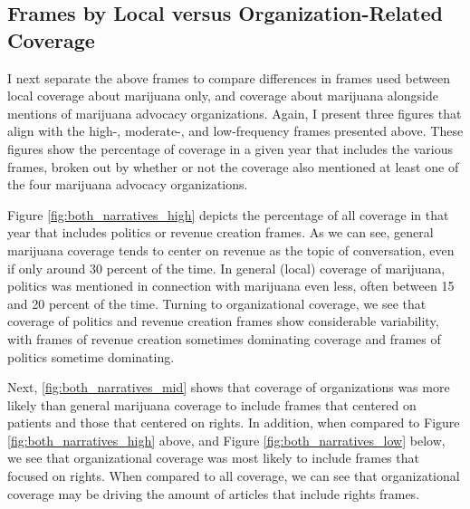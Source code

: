 \subsection{Frames by Local versus Organization-Related Coverage}

I next separate the above frames to compare differences in frames used between local coverage about marijuana only, and coverage about marijuana alongside mentions of marijuana advocacy organizations. Again, I present three figures that align with the high-, moderate-, and low-frequency frames presented above. These figures show the percentage of coverage in a given year that includes the various frames, broken out by whether or not the coverage also mentioned at least one of the four marijuana advocacy organizations. 

Figure \ref{fig:both_narratives_high} depicts the percentage of all coverage in that year that includes politics or revenue creation frames. As we can see, general marijuana coverage tends to center on revenue as the topic of conversation, even if only around 30 percent of the time. In general (local) coverage of marijuana, politics was mentioned in connection with marijuana even less, often between 15 and 20 percent of the time. Turning to organizational coverage, we see that coverage of politics and revenue creation frames show considerable variability, with frames of revenue creation sometimes dominating coverage and frames of politics sometime dominating. 






Next, \ref{fig:both_narratives_mid} shows that coverage of organizations was more likely than general marijuana coverage to include frames that centered on patients and those that centered on rights. In addition, when compared to Figure \ref{fig:both_narratives_high} above, and Figure \ref{fig:both_narratives_low} below, we see that organizational coverage was most likely to include frames that focused on rights. When compared to all coverage, we can see that organizational coverage may be driving the amount of articles that include rights frames. 

